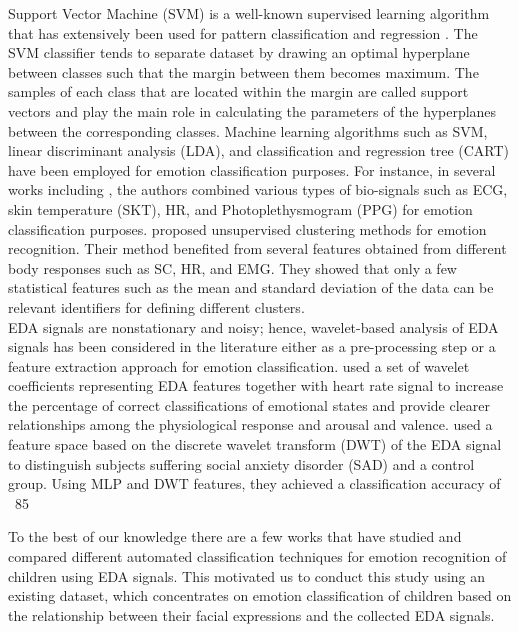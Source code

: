 Support Vector Machine (SVM) is a well-known supervised learning algorithm that has 
extensively been used for pattern classification and regression \cite{SupportVector1995}. The SVM classifier tends to separate dataset by drawing an optimal hyperplane 
between classes such that the margin between them becomes maximum. The samples of 
each class that are located within the margin are called support vectors and play the 
main role in calculating the parameters of the hyperplanes between the corresponding 
classes. Machine learning algorithms such as SVM, linear discriminant analysis (LDA), 
and classification and regression tree (CART) have been employed for emotion 
classification purposes. For instance, in several works including \cite{Taxonomy2011, EmotionClassifi2014}, the authors combined various types of bio-signals such as ECG, 
skin temperature (SKT), HR, and Photoplethysmogram (PPG) for  emotion classification 
purposes. \cite{FeatureSelection2006} proposed unsupervised clustering methods for emotion 
recognition. Their method benefited from several features obtained from different 
body responses such as SC, HR, and EMG. They showed that only a few statistical 
features such as the mean and standard deviation of the data can be relevant identifiers 
for defining different clusters. \\

EDA signals are nonstationary and noisy; hence, wavelet-based analysis of EDA signals 
has been considered in the literature \cite{EmotionalState2013, EMGGSR2009}
either as a pre-processing step or a feature extraction approach for emotion classification. 
\cite{EmotionalState2013} used a set of wavelet coefficients representing EDA features 
together with heart rate signal to increase the percentage of correct classifications 
of emotional states and provide clearer relationships among the physiological response 
and arousal and valence. \cite{EDA2016} used a feature space based on the 
discrete wavelet transform (DWT) of the EDA signal to distinguish subjects suffering 
social anxiety disorder (SAD) and a control group. Using MLP and DWT features, they 
achieved a classification accuracy of ~85%

To the best of our knowledge there are a few works \cite{EmotionResp2013, SlowEcho2009} that have studied and compared different automated 
classification techniques for emotion recognition of children using EDA signals. 
This motivated us to conduct this study using an existing dataset, which concentrates 
on emotion classification of children based on the relationship between their facial 
expressions and the collected EDA signals.


